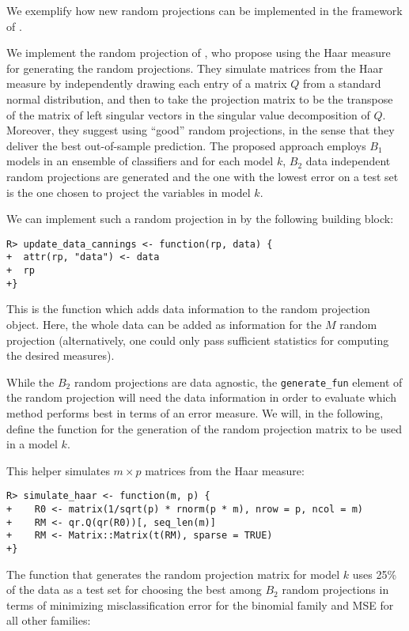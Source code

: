\documentclass[
  article]{jss}
\begin{document}
We exemplify how new random projections can be implemented in the
framework of .

We implement the random projection of \citet{cannings2017random}, who
propose using the Haar measure for generating the random projections.
They simulate matrices from the Haar measure by independently drawing
each entry of a matrix \(Q\) from a standard normal distribution, and
then to take the projection matrix to be the transpose of the matrix of
left singular vectors in the singular value decomposition of \(Q\).
Moreover, they suggest using ``good'' random projections, in the sense
that they deliver the best out-of-sample prediction. The proposed
approach employs \(B_1\) models in an ensemble of classifiers and for
each model \(k\), \(B_2\) data independent random projections are
generated and the one with the lowest error on a test set is the one
chosen to project the variables in model \(k\).

We can implement such a random projection in  by the following
building block:

\begin{verbatim}
R> update_data_cannings <- function(rp, data) {
+  attr(rp, "data") <- data
+  rp
+}
\end{verbatim}

This is the function which adds data information to the random
projection object. Here, the whole data can be added as information for
the \(M\) random projection (alternatively, one could only pass
sufficient statistics for computing the desired measures).

While the \(B_2\) random projections are data agnostic, the
\texttt{generate\_fun} element of the random projection will need the
data information in order to evaluate which method performs best in
terms of an error measure. We will, in the following, define the
function for the generation of the random projection matrix to be used
in a model \(k\).

This helper simulates \(m\times p\) matrices from the Haar measure:

\begin{verbatim}
R> simulate_haar <- function(m, p) {
+    R0 <- matrix(1/sqrt(p) * rnorm(p * m), nrow = p, ncol = m)
+    RM <- qr.Q(qr(R0))[, seq_len(m)]
+    RM <- Matrix::Matrix(t(RM), sparse = TRUE)  
+}
\end{verbatim}

The function that generates the random projection matrix for model \(k\)
uses 25\% of the data as a test set for choosing the best among \(B_2\)
random projections in terms of minimizing misclassification error for
the binomial family and MSE for all other families:
\end{document}
